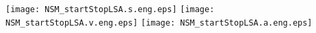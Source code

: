 \documentclass[a4paper,12pt]{article}
\begin{document}

\begin{center}
\texttt{[image: NSM\_startStopLSA.s.eng.eps]} 
\texttt{[image: NSM\_startStopLSA.v.eng.eps]}
\texttt{[image: NSM\_startStopLSA.a.eng.eps]}
\end{center}

\end{document}
